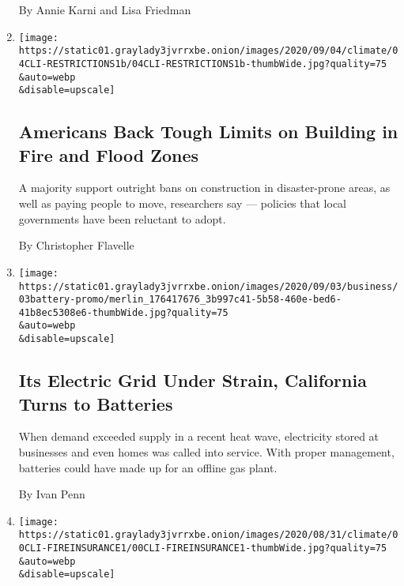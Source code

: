 \begin{enumerate}
  By Annie Karni and Lisa Friedman
\item
  \href{/2020/09/04/climate/flood-fire-building-restrictions.html}{}

  \texttt{[image: https://static01.graylady3jvrrxbe.onion/images/2020/09/04/climate/04CLI-RESTRICTIONS1b/04CLI-RESTRICTIONS1b-thumbWide.jpg?quality=75\\\&auto=webp\\\&disable=upscale]}

  \hypertarget{americans-back-tough-limits-on-building-in-fire-and-flood-zones}{%
  \subsection{Americans Back Tough Limits on Building in Fire and Flood
  Zones}\label{americans-back-tough-limits-on-building-in-fire-and-flood-zones}}

  A majority support outright bans on construction in disaster-prone
  areas, as well as paying people to move, researchers say --- policies
  that local governments have been reluctant to adopt.

  By Christopher Flavelle
\item
  \href{/2020/09/03/business/energy-environment/california-electricity-blackout-battery.html}{}

  \texttt{[image: https://static01.graylady3jvrrxbe.onion/images/2020/09/03/business/03battery-promo/merlin\_176417676\_3b997c41-5b58-460e-bed6-41b8ec5308e6-thumbWide.jpg?quality=75\\\&auto=webp\\\&disable=upscale]}

  \hypertarget{its-electric-grid-under-strain-california-turns-to-batteries}{%
  \subsection{Its Electric Grid Under Strain, California Turns to
  Batteries}\label{its-electric-grid-under-strain-california-turns-to-batteries}}

  When demand exceeded supply in a recent heat wave, electricity stored
  at businesses and even homes was called into service. With proper
  management, batteries could have made up for an offline gas plant.

  By Ivan Penn
\item
  \href{/2020/09/02/climate/wildfires-insurance.html}{}

  \texttt{[image: https://static01.graylady3jvrrxbe.onion/images/2020/08/31/climate/00CLI-FIREINSURANCE1/00CLI-FIREINSURANCE1-thumbWide.jpg?quality=75\\\&auto=webp\\\&disable=upscale]}


\end{enumerate}
